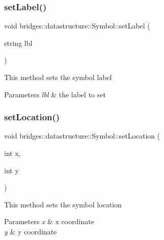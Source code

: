 \subsubsection{\texorpdfstring{setLabel()}{setLabel()}}
{\footnotesize\ttfamily void bridges\+::datastructure\+::\+Symbol\+::set\+Label (\begin{DoxyParamCaption}\item[{string}]{lbl }\end{DoxyParamCaption})\hspace{0.3cm}{\ttfamily [inline]}}

This method sets the symbol label


\begin{DoxyParams}{Parameters}
{\em lbl} & the label to set \\
\hline
\end{DoxyParams}
\mbox{\label{classbridges_1_1datastructure_1_1_symbol_a9c62675b598fc5e755721576852f2dcf}} 
\subsubsection{\texorpdfstring{setLocation()}{setLocation()}\hspace{0.1cm}{\footnotesize\ttfamily [1/2]}}
{\footnotesize\ttfamily void bridges\+::datastructure\+::\+Symbol\+::set\+Location (\begin{DoxyParamCaption}\item[{int}]{x,  }\item[{int}]{y }\end{DoxyParamCaption})\hspace{0.3cm}{\ttfamily [inline]}}

This method sets the symbol location


\begin{DoxyParams}{Parameters}
{\em x} & x coordinate \\
\hline
{\em y} & y coordinate \\
\hline
\end{DoxyParams}
\mbox{\label{classbridges_1_1datastructure_1_1_symbol_a4dbf51dac8b22b293a7061f5eb84b460}} 
